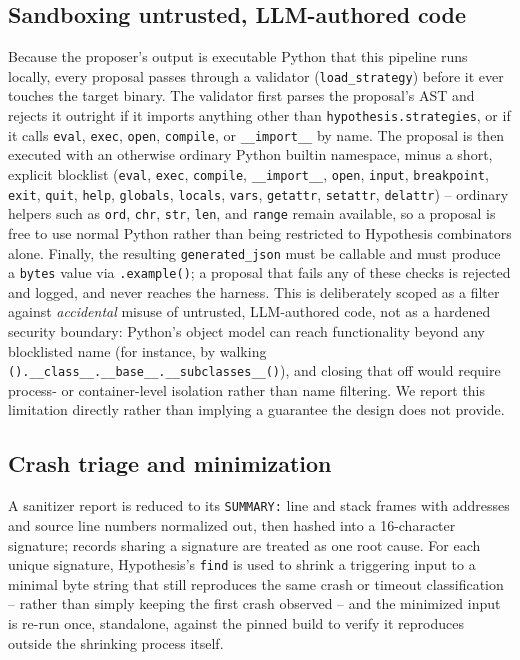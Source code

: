 \subsection{Sandboxing untrusted, LLM-authored code}
Because the proposer's output is executable Python that this pipeline runs
locally, every proposal passes through a validator
(\texttt{load\_strategy}) before it ever touches the target binary. The
validator first parses the proposal's AST and rejects it outright if it
imports anything other than \texttt{hypothesis.strategies}, or if it calls
\texttt{eval}, \texttt{exec}, \texttt{open}, \texttt{compile}, or
\texttt{\_\_import\_\_} by name. The proposal is then executed with an
otherwise ordinary Python builtin namespace, minus a short, explicit
blocklist (\texttt{eval}, \texttt{exec}, \texttt{compile},
\texttt{\_\_import\_\_}, \texttt{open}, \texttt{input}, \texttt{breakpoint},
\texttt{exit}, \texttt{quit}, \texttt{help}, \texttt{globals},
\texttt{locals}, \texttt{vars}, \texttt{getattr}, \texttt{setattr},
\texttt{delattr}) -- ordinary helpers such as \texttt{ord}, \texttt{chr},
\texttt{str}, \texttt{len}, and \texttt{range} remain available, so a
proposal is free to use normal Python rather than being restricted to
Hypothesis combinators alone. Finally, the resulting \texttt{generated\_json}
must be callable and must produce a \texttt{bytes} value via
\texttt{.example()}; a proposal that fails any of these checks is rejected
and logged, and never reaches the harness. This is deliberately scoped as a
filter against \emph{accidental} misuse of untrusted, LLM-authored code, not
as a hardened security boundary: Python's object model can reach
functionality beyond any blocklisted name (for instance, by walking
\texttt{().\_\_class\_\_\allowbreak.\_\_base\_\_\allowbreak.\_\_subclasses\_\_()}), and closing
that off would require process- or container-level isolation rather than
name filtering. We report this limitation directly rather than implying a
guarantee the design does not provide.

\subsection{Crash triage and minimization}
A sanitizer report is reduced to its \texttt{SUMMARY:} line and stack
frames with addresses and source line numbers normalized out, then hashed
into a 16-character signature; records sharing a signature are treated as
one root cause. For each unique signature, Hypothesis's \texttt{find} is
used to shrink a triggering input to a minimal byte string that still
reproduces the same crash or timeout classification -- rather than simply
keeping the first crash observed -- and the minimized input is re-run once,
standalone, against the pinned build to verify it reproduces outside the
shrinking process itself.

